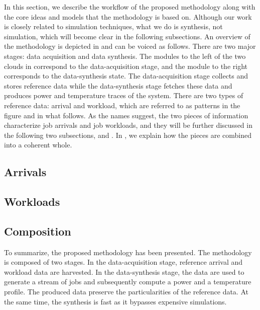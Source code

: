 In this section, we describe the workflow of the proposed methodology along with
the core ideas and models that the methodology is based on. Although our work is
closely related to simulation techniques, what we do is synthesis, not
simulation, which will become clear in the following subsections. An overview of
the methodology is depicted in  and can be voiced as follows.
There are two major stages: data acquisition and data synthesis. The modules to
the left of the two clouds in  correspond to the
data-acquisition stage, and the module to the right corresponds to the
data-synthesis state. The data-acquisition stage collects and stores reference
data while the data-synthesis stage fetches these data and produces power and
temperature traces of the system. There are two types of reference data: arrival
and workload, which are referred to as patterns in the figure and in what
follows. As the names suggest, the two pieces of information characterize job
arrivals and job workloads, and they will be further discussed in the following
two subsections,  and . In , we
explain how the pieces are combined into a coherent whole.

\subsection{Arrivals} 


\subsection{Workloads} 


\subsection{Composition} 


To summarize, the proposed methodology has been presented. The methodology is
composed of two stages. In the data-acquisition stage, reference arrival and
workload data are harvested. In the data-synthesis stage, the data are used to
generate a stream of jobs and subsequently compute a power and a temperature
profile. The produced data preserve the particularities of the reference data.
At the same time, the synthesis is fast as it bypasses expensive simulations.
